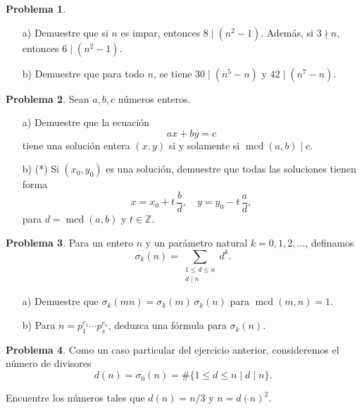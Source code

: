 \documentclass{article}
\newcommand{\ZZ}{\mathbb{Z}}
\DeclareMathOperator{\mcd}{mcd}
\theoremstyle{definition}
\newtheorem{problema}{Problema}
\begin{document}
\begin{problema}
  ~

  \begin{enumerate}
  \item[a)] Demuestre que si $n$ es impar, entonces $8 \mid (n^2 - 1)$. Además,
    si $3\nmid n$, entonces $6 \mid (n^2 - 1)$.

  \item[b)] Demuestre que para todo $n$, se tiene $30 \mid (n^5 - n)$ y
    $42 \mid (n^7 - n)$.
  \end{enumerate}
\end{problema}

\begin{problema}
  Sean $a,b,c$ números enteros.

  \begin{enumerate}
  \item[a)] Demuestre que la ecuación
    $$ax + by = c$$
    tiene una solución entera $(x,y)$ si y solamente si $\mcd (a,b) \mid c$.

  \item[b)] (*) Si $(x_0,y_0)$ es una solución, demuestre que todas las
    soluciones tienen forma
    $$x = x_0 + t\,\frac{b}{d}, \quad y = y_0 - t\,\frac{a}{d},$$
    para $d = \mcd (a,b)$ y $t \in \ZZ$.
  \end{enumerate}
\end{problema}

\begin{problema}
  Para un entero $n$ y un parámetro natural $k = 0,1,2,\ldots$, definamos
  $$\sigma_k (n) = \sum_{\substack{1 \le d \le n \\ d \mid n}} d^k.$$

  \begin{enumerate}
  \item[a)] Demuestre que $\sigma_k (mn) = \sigma_k (m) \, \sigma_k (n)$ para
    $\mcd (m,n) = 1$.

  \item[b)] Para $n = p_1^{e_1} \cdots p_s^{e_s}$, deduzca una fórmula para
    $\sigma_k (n)$.
  \end{enumerate}
\end{problema}

\begin{problema}
  Como un caso particular del ejercicio anterior, consideremos el número de
  divisores
  $$d (n) = \sigma_0 (n) = \# \{ 1 \le d \le n \mid d \mid n \}.$$

  Encuentre los números tales que $d (n) = n/3$ y $n = d(n)^2$.
\end{problema}
\end{document}
